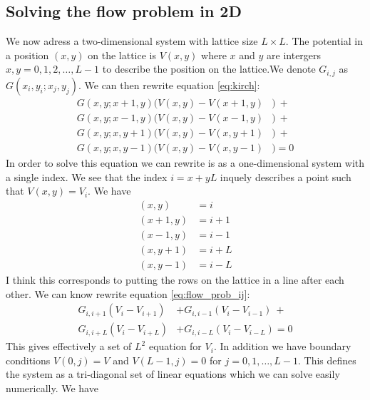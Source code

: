 \documentclass[reprint, amsmath, amssymb, aps]{revtex4-2}
\begin{document}
\subsection{Solving the flow problem in 2D}
We now adress a two-dimensional system with lattice size $L\times L$. The potential in a position $(x,y)$ on the lattice is $V(x,y)$ where $x$ and $y$ are intergers $x,y = 0,1,2,\hdots, L-1$ to describe the position on the lattice.We denote $G_{i,j}$ as $G(x_i, y_i; x_j, y_j)$. We can then rewrite equation \ref{eq:kirch}:
\begin{align}
  G(x, y; x+1, y)(V(x,y) - V(x+1,y)&) \ + \\
  G(x, y; x-1, y)(V(x,y) - V(x-1,y)&) \ + \\
  G(x, y; x, y+1)(V(x,y) - V(x,y+1)&) \ + \\
  G(x, y; x, y-1)(V(x,y) - V(x,y-1)&) = 0
  \label{eq:flow_prob_ij}
\end{align}
In order to solve this equation we can rewrite is as a one-dimensional system with a single index. We see that the index $i = x + yL$ inquely describes a point such that $V(x,y) = V_i$. We have
\begin{align*}
  (x,y) &= i \\
  (x+1,y) &= i+1 \\
  (x-1,y) &= i-1 \\
  (x,y+1) &= i+L \\
  (x,y-1) &= i-L
\end{align*}
I think this corresponds to putting the rows on the lattice in a line after each other. We can know rewrite equation \ref{eq:flow_prob_ij}:
\begin{align}
  G_{i,i+1}(V_i - V_{i+1}) &+
  G_{i,i-1}(V_i - V_{i-1}) \ + \\
  G_{i,i+L}(V_i - V_{i+L}) &+
  G_{i,i-L}(V_i - V_{i-L}) = 0
  \label{eq:flow_prob_i}
\end{align}
\onecolumngrid
\hfill \linebreak
This gives effectively a set of $L^2$ equation for $V_i$. In addition we have boundary conditions $V(0,j) = V$ and $V(L-1,j) = 0$ for $j = 0,1,\hdots,L-1$. This defines the system as a tri-diagonal set of linear equations which we can solve easily numerically. We have
\end{document}
